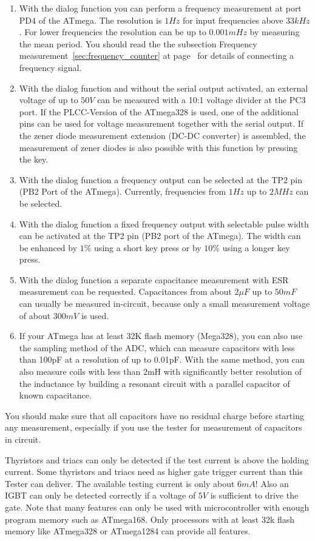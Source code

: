 \begin{enumerate}
\item With the dialog function you can perform a frequency measurement at port PD4 of the ATmega.
The resolution is \(1Hz\) for input frequencies above \(33kHz\).
For lower frequencies the resolution can be up to \(0.001mHz\) by measuring the mean period.
You should read the the subsection Frequency measurement~\ref{sec:frequency_counter} at page~\pageref{sec:frequency_counter} 
for details of connecting a frequency signal.
\item With the dialog function and without the serial output activated, an external voltage of up to \(50V\) can be measured with
a 10:1 voltage divider at the PC3 port. If the PLCC-Version of the ATmega328 is used, one of the additional
pins can be used for voltage measurement together with the serial output.
If the zener diode measurement extension (DC-DC converter) is assembled, the measurement of
zener diodes is also possible with this function by pressing the key.
\item With the dialog function a frequency output can be selected at the TP2 pin (PB2 Port of the ATmega).
Currently, frequencies from \(1Hz\) up to \(2MHz\) can be selected.
\item With the dialog function a fixed frequency output with selectable pulse width can be activated at the TP2 pin
(PB2 port of the ATmega). The width can be enhanced by \(1\%\) using a short key press or by \(10\%\) using a longer key press.
\item With the dialog function a separate capacitance measurement with ESR measurement can be requested.
Capacitances from about \(2\mu F\) up to \(50mF\) can usually be measured in-circuit, because only a small 
measurement voltage of about \(300mV\) is used.
\item If your ATmega has at least 32K flash memory (Mega328), you can also use the sampling method of the ADC,
which can measure capacitors with less than 100pF at a resolution of up to 0.01pF.
With the same method, you can also measure coils with less than 2mH with significantly better resolution of the inductance
by building a resonant circuit with a parallel capacitor of known capacitance.

\end{enumerate}

You should make sure that all capacitors have no residual charge before starting any measurement,
especially if you use the tester for measurement of capacitors in circuit.

Thyristors and triacs can only be detected if the test current is above the holding current.
Some thyristors and triacs need as higher gate trigger current than this Tester can deliver.
The available testing current is only about \(6mA\)!
Also an IGBT can only be detected correctly if a voltage of \(5V\) is sufficient to drive the gate.
Note that many features can only be used with microcontroller with enough program memory such as ATmega168.
Only processors with at least 32k flash memory like ATmega328 or ATmega1284 can provide all features.

